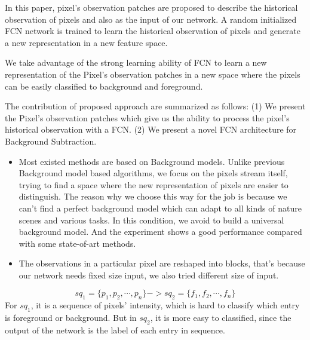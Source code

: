 \documentclass[journal]{IEEEtran}
\begin{document}
In this paper, pixel’s observation patches are proposed to describe the historical observation of pixels and also as the input of our network. 
A random initialized FCN network is trained to learn the historical observation of pixels and generate a new representation in a new feature space.

We take advantage of the strong learning ability of FCN to learn a new representation of the Pixel’s observation patches in a new space where 
the pixels can be easily classified to background and foreground. 

The contribution of proposed approach are summarized as follows:
(1) We present the Pixel's observation patches which give us the ability to process the pixel's historical observation with a FCN.
(2) We present a novel FCN architecture for Background Subtraction.
 
\begin{itemize}
    \item    
        Most existed methods are based on Background models. 
        Unlike previous Background model based algorithms, we focus on the pixels stream itself, trying to find a space where the new representation
        of pixels are easier to distinguish. 
        The reason why we choose this way for the job is because we can't find a perfect background model which can adapt to all kinds of nature 
        scenes and various tasks. In this condition, we avoid to build a universal background model. And the experiment shows a good performance 
        compared with some state-of-art methods.

    \item The observations in a particular pixel are reshaped into blocks, that's because our network needs fixed size input, we also tried different 
        size of input.
\end{itemize}
\begin{equation}
    sq_1 = \{p_1,p_2,\cdots, p_n\} -> sq_2 = \{f_1, f_2, \cdots, f_n\}
\end{equation}
For $sq_1$, it is a sequence of pixels' intensity, which is hard to classify which entry is foreground or background.
%
But in $sq_2$, it is more easy to classified, since the output of the network is the label of each entry in sequence.
\end{document}
